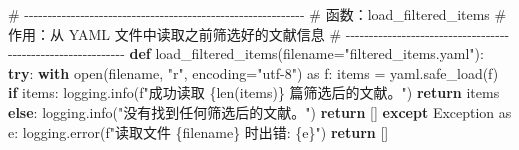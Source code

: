 \documentclass[
  letterpaper,
  DIV=11,
  numbers=noendperiod]{scrreprt}
\newenvironment{Shaded}{\begin{snugshade}}{\end{snugshade}}
\newcommand{\BuiltInTok}[1]{\textcolor[rgb]{0.00,0.23,0.31}{#1}}
\newcommand{\CommentTok}[1]{\textcolor[rgb]{0.37,0.37,0.37}{#1}}
\newcommand{\ControlFlowTok}[1]{\textcolor[rgb]{0.00,0.23,0.31}{\textbf{#1}}}
\newcommand{\ImportTok}[1]{\textcolor[rgb]{0.00,0.46,0.62}{#1}}
\newcommand{\KeywordTok}[1]{\textcolor[rgb]{0.00,0.23,0.31}{\textbf{#1}}}
\newcommand{\NormalTok}[1]{\textcolor[rgb]{0.00,0.23,0.31}{#1}}
\newcommand{\OperatorTok}[1]{\textcolor[rgb]{0.37,0.37,0.37}{#1}}
\newcommand{\PreprocessorTok}[1]{\textcolor[rgb]{0.68,0.00,0.00}{#1}}
\newcommand{\SpecialCharTok}[1]{\textcolor[rgb]{0.37,0.37,0.37}{#1}}
\newcommand{\SpecialStringTok}[1]{\textcolor[rgb]{0.13,0.47,0.30}{#1}}
\newcommand{\StringTok}[1]{\textcolor[rgb]{0.13,0.47,0.30}{#1}}
\begin{document}
\begin{Shaded}
\begin{Highlighting}[]
\CommentTok{\# {-}{-}{-}{-}{-}{-}{-}{-}{-}{-}{-}{-}{-}{-}{-}{-}{-}{-}{-}{-}{-}{-}{-}{-}{-}{-}{-}{-}{-}{-}{-}{-}{-}{-}{-}{-}{-}{-}{-}{-}{-}{-}{-}{-}{-}{-}{-}{-}{-}{-}{-}{-}{-}{-}{-}{-}{-}{-}{-}{-}}
\CommentTok{\# 函数：load\_filtered\_items}
\CommentTok{\# 作用：从 YAML 文件中读取之前筛选好的文献信息}
\CommentTok{\# {-}{-}{-}{-}{-}{-}{-}{-}{-}{-}{-}{-}{-}{-}{-}{-}{-}{-}{-}{-}{-}{-}{-}{-}{-}{-}{-}{-}{-}{-}{-}{-}{-}{-}{-}{-}{-}{-}{-}{-}{-}{-}{-}{-}{-}{-}{-}{-}{-}{-}{-}{-}{-}{-}{-}{-}{-}{-}{-}{-}}
\KeywordTok{def}\NormalTok{ load\_filtered\_items(filename}\OperatorTok{=}\StringTok{"filtered\_items.yaml"}\NormalTok{):}
    \ControlFlowTok{try}\NormalTok{:}
        \ControlFlowTok{with} \BuiltInTok{open}\NormalTok{(filename, }\StringTok{"r"}\NormalTok{, encoding}\OperatorTok{=}\StringTok{"utf{-}8"}\NormalTok{) }\ImportTok{as}\NormalTok{ f:}
\NormalTok{            items }\OperatorTok{=}\NormalTok{ yaml.safe\_load(f)}
        \ControlFlowTok{if}\NormalTok{ items:}
\NormalTok{            logging.info(}\SpecialStringTok{f"成功读取 }\SpecialCharTok{\{}\BuiltInTok{len}\NormalTok{(items)}\SpecialCharTok{\}}\SpecialStringTok{ 篇筛选后的文献。"}\NormalTok{)}
            \ControlFlowTok{return}\NormalTok{ items}
        \ControlFlowTok{else}\NormalTok{:}
\NormalTok{            logging.info(}\StringTok{"没有找到任何筛选后的文献。"}\NormalTok{)}
            \ControlFlowTok{return}\NormalTok{ []}
    \ControlFlowTok{except} \PreprocessorTok{Exception} \ImportTok{as}\NormalTok{ e:}
\NormalTok{        logging.error(}\SpecialStringTok{f"读取文件 }\SpecialCharTok{\{}\NormalTok{filename}\SpecialCharTok{\}}\SpecialStringTok{ 时出错: }\SpecialCharTok{\{}\NormalTok{e}\SpecialCharTok{\}}\SpecialStringTok{"}\NormalTok{)}
        \ControlFlowTok{return}\NormalTok{ []}


\end{Highlighting}
\end{Shaded}
\end{document}
